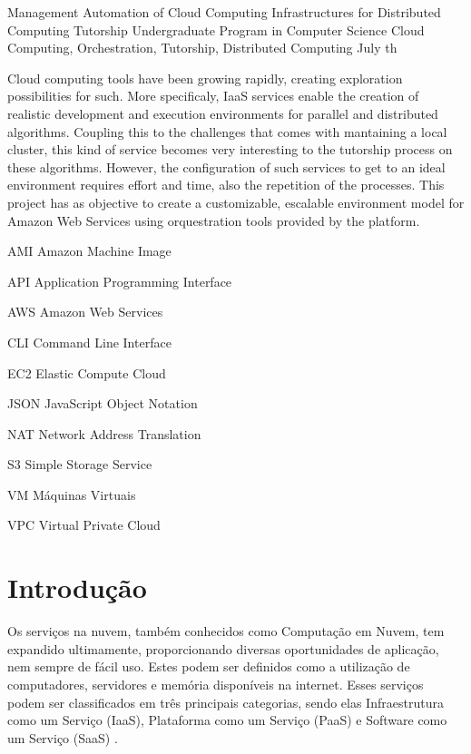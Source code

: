 \documentclass[tg]{mdtufsm}
\begin{document}
\begin{englishabstract}
	{Management Automation of Cloud Computing Infrastructures for Distributed Computing Tutorship}
	{Undergraduate Program in Computer Science}
	{Cloud Computing, Orchestration, Tutorship, Distributed Computing}
	{July}
	{th}
	
Cloud computing tools have been growing rapidly, creating exploration possibilities for such. More specificaly, IaaS services enable the creation of realistic development and execution environments for parallel and distributed algorithms. Coupling this to the challenges that comes with mantaining a local cluster, this kind of service becomes very interesting to the tutorship process on these algorithms. However, the configuration of such services to get to an ideal environment requires effort and time, also the repetition of the processes. This project has as objective to create a customizable, escalable environment model for Amazon Web Services using orquestration tools provided by the platform.
	
\end{englishabstract}


\tableofcontents
\listoffigures
\listofappendix

\begin{listofabbrv}{20in}
\item[AMI]	Amazon Machine Image
\item[API]	Application Programming Interface
\item[AWS]	Amazon Web Services
\item[CLI]	Command Line Interface
\item[EC2]	Elastic Compute Cloud
\item[JSON]	JavaScript Object Notation
\item[NAT]	Network Address Translation
\item[S3]	Simple Storage Service
\item[VM]	Máquinas Virtuais
\item[VPC]	Virtual Private Cloud
\end{listofabbrv}



\setlength{\baselineskip}{1.5\baselineskip}

\chapter{Introdução}

Os serviços na nuvem, também conhecidos como Computação em Nuvem, tem expandido ultimamente, proporcionando diversas oportunidades de aplicação, nem sempre de fácil uso. Estes podem ser definidos como a utilização de computadores, servidores e memória disponíveis na internet. Esses serviços podem ser classificados em três principais categorias, sendo elas Infraestrutura como um Serviço (IaaS), Plataforma como um Serviço (PaaS) e Software como um Serviço (SaaS) \cite{xaas2}.
\end{document}
